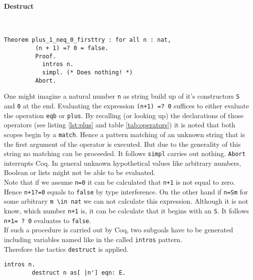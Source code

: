 	   \paragraph{Destruct}	~\vspace{-5mm}
	   \begin{lstlisting}[caption= \lstinline! plus_1_neq_0_firsttry!, label=lst:plus_1_neq_0_firsttry]
	   Theorem plus_1_neq_0_firsttry : for all n : nat,
	     (n + 1) =? 0 = false.
	     Proof.
	       intros n.
	       simpl. (* Does nothing! *)
	     Abort.
	   \end{lstlisting}
	    One might imagine a natural number \lstinline!n! as string build up of it's constructors \lstinline!S! and \lstinline!0! at the end.
	    Evaluating the expression \lstinline!(n+1) =? 0! suffices to either evaluate the operation \lstinline!eqb! or \lstinline!plus!.
	    By recalling (or looking up) the declarations of those operators (see listing \ref{lst:plus} and table \ref{tab:operators}) it is noted that both scopes begin by a \lstinline!match!.
	    Hence a pattern matching of an unknown string that is the first argument of the operator is executed.
	    But due to the generality of this string no matching can be proceeded. It follows \lstinline!simpl! carries out nothing. \lstinline!Abort! interrupts Coq.
	    In general unknown hypothetical values like arbitrary numbers, Boolean or lists might not be able to be evaluated.\\		
		Note that if we assume \lstinline!n=0! it can be calculated that \lstinline!n+1! is not equal to zero.
		Hence \lstinline!n+1?=0! equals to \lstinline!false! by type interference. 
		On the other hand if \lstinline!n=Sm! for some arbitrary \lstinline!m \in nat! we can not calculate this expression.
		Although it is not know, which number \lstinline!n+1! is, it can be calculate that it begins with an \lstinline!S!.
		It follows \lstinline!n+1= ? 0! evaluates to \lstinline!false!.\\	
	    If such a procedure is carried out by Coq, two subgoals have to be generated including variables named like in the called \lstinline!intros! pattern.\\        
	    Therefore the tactics \lstinline!destruct! is applied.	
		\begin{lstlisting}[caption = \lstinline! destruct!]
		intros n.
		destruct n as[ |n'] eqn: E.
		\end{lstlisting}
		
